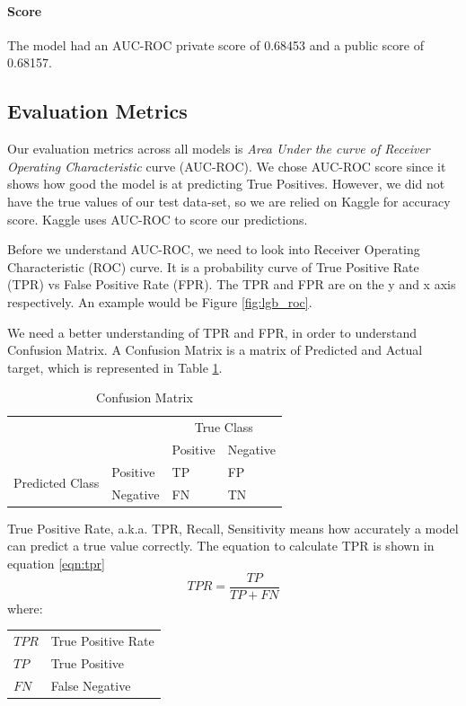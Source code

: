 \documentclass[sigconf, nonacm]{acmart}
\makeatletter
\newenvironment{conditions}
  {\par\vspace{\abovedisplayskip}\noindent\begin{tabular}{>{$}l<{$} @{${}={}$} l}}
  {\end{tabular}\par\vspace{\belowdisplayskip}}
\makeatother
\begin{document}
\paragraph{Score}
The model had an AUC-ROC private score of 0.68453 and a public score of 0.68157. 

\subsection{Evaluation Metrics} \label{subsec:aucroc}

Our evaluation metrics across all models is \emph{Area Under the curve of Receiver Operating Characteristic} curve (AUC-ROC)\cite{narkhede2018understanding}. We chose AUC-ROC score since it shows how good the model is at predicting True Positives. However, we did not have the true values of our test data-set, so we are relied on Kaggle for accuracy score. Kaggle uses AUC-ROC to score our predictions.

Before we understand AUC-ROC, we need to look into Receiver Operating Characteristic (ROC) curve. It is a probability curve of True Positive Rate (TPR) vs False Positive Rate (FPR). The TPR and FPR are on the y and x axis respectively. An example would be Figure \ref{fig:lgb_roc}.

We need a better understanding of TPR and FPR, in order to understand Confusion Matrix. A Confusion Matrix is a matrix of Predicted and Actual target, which is represented in Table \ref{tab:conf_mat}. 

\begin{table}[h]
	\caption{Confusion Matrix}
	\label{tab:conf_mat}
	\begin{tabular}{ll|l|l|}
		\cline{3-4}
		&          & \multicolumn{2}{c|}{True Class} \\ \cline{3-4} 
		                                                       &          & Positive & Negative \\ \hline
		\multicolumn{1}{|c|}{\multirow{2}{*}{Predicted Class}} & Positive & TP       & FP       \\ \cline{2-4} 
		\multicolumn{1}{|c|}{}                                 & Negative & FN       & TN       \\ \hline
	\end{tabular}
\end{table}

True Positive Rate, a.k.a. TPR, Recall, Sensitivity means how accurately a model can predict a true value correctly. The equation to calculate TPR is shown in equation \ref{eqn:tpr}
\begin{equation}
	\label{eqn:tpr}
	TPR = \frac{TP}{TP + FN}
\end{equation}
where:
\begin{conditions}
	TPR     &   True Positive Rate  \\
	TP      &   True Positive       \\
	FN      &   False Negative      \\
\end{conditions}
\end{document}
